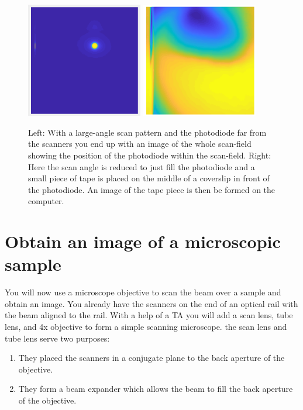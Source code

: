 \documentclass[a4paper]{report}
\begin{document}
\begin{figure}[h]
\centering
\includegraphics[width=2in]{distantPhotoDiode.png}
\includegraphics[width=2in]{PhotoDiode_2Dimage.png}
\caption{Left: With a large-angle scan pattern and the photodiode far from the scanners you end up with an image of the whole scan-field showing the position of the photodiode within the scan-field.
         Right: Here the scan angle is reduced to just fill the photodiode and a small piece of tape is placed on the middle of a coverslip in front of the photodiode. 
         An image of the tape piece is then be formed on the computer.}
\label{PDimage}
\end{figure}



\clearpage


\section{Obtain an image of a microscopic sample}
You will now use a microscope objective to scan the beam over a sample and obtain an image. 
You already have the scanners on the end of an optical rail with the beam aligned to the rail. 
With a help of a TA you will add a scan lens, tube lens, and 4x objective to form a simple scanning microscope. 
the scan lens and tube lens serve two purposes:

\begin{enumerate}
\setlength\itemsep{0.1em}
\item They placed the scanners in a conjugate plane to the back aperture of the objective. 
\item They form a beam expander which allows the beam to fill the back aperture of the objective.
\end{enumerate}
\end{document}
